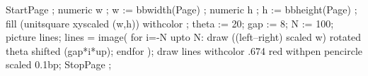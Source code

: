     StartPage ;
    numeric w ; w := bbwidth(Page) ;
    numeric h ; h := bbheight(Page) ;
    fill (unitsquare xyscaled (w,h)) withcolor  ;
    theta := 20; gap := 8; N := 100;
    picture lines; lines = image( 
    for i=-N upto N: 
       draw ((left--right) scaled w) rotated theta shifted (gap*i*up); 
    endfor );
    draw lines withcolor .674 red withpen pencircle scaled 0.1bp;
    StopPage ;
\stopuseMPgraphic

\setupbackgrounds[page][background=cover]

\startstandardmakeup
  \raggedcenter
  \vfill {}\setstrut \strut \color[white]{ramp} 
  \blank[2*big] \setstrut \strut \color[white]{test}
  \vfill
\stopstandardmakeup

\setupbackgrounds[page][background=]
